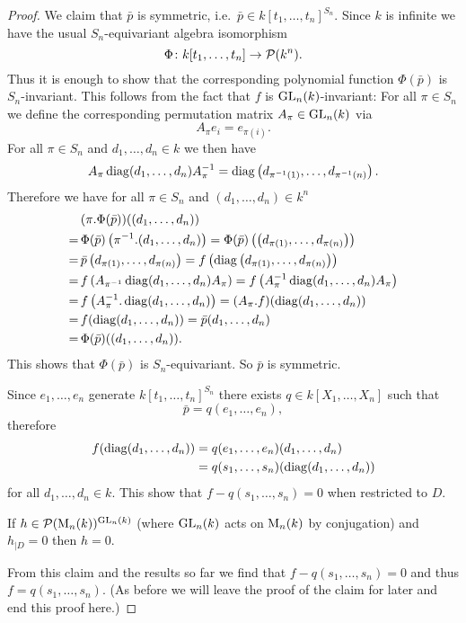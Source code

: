 \begin{proof}
 We claim that $\bar{p}$ is symmetric, i.e.\ $\bar{p} \in k[t_1, \dotsc, t_n]^{S_n}$. Since $k$ is infinite we have the usual $S_n$-equivariant algebra isomorphism
 \[
 \Phi \colon k[t_1, \dotsc, t_n] \to \mathcal{P}(k^n).
 \]
 Thus it is enough to show that the corresponding polynomial function $\Phi(\bar{p})$ is $S_n$-invariant. This follows from the fact that $f$ is $\operatorname{GL}_n(k)$-invariant: For all $\pi \in S_n$ we define the corresponding permutation matrix $A_\pi \in \operatorname{GL}_n(k)$ via
 \[
  A_\pi e_i = e_{\pi(i)}.
 \]
 For all $\pi \in S_n$ and $d_1, \dotsc, d_n \in k$ we then have
 \[
  A_\pi \operatorname{diag}(d_1, \dotsc, d_n) A_\pi^{-1}
  = \operatorname{diag}\left(d_{\pi^{-1}(1)}, \dotsc, d_{\pi^{-1}(n)}\right).
 \]
 Therefore we have for all $\pi \in S_n$ and $(d_1, \dotsc, d_n) \in k^n$
 \begin{align*}
  &\,(\pi.\Phi(\bar{p}))((d_1, \dotsc, d_n)) \\
  =&\, \Phi(\bar{p})\left(\pi^{-1}.(d_1, \dotsc, d_n)\right)
  = \Phi(\bar{p})\left(\left(d_{\pi(1)}, \dotsc, d_{\pi(n)}\right)\right) \\
  =&\, \bar{p}\left(d_{\pi(1)}, \dotsc, d_{\pi(n)}\right)
  = f\left(\operatorname{diag}\left(d_{\pi(1)}, \dotsc, d_{\pi(n)}\right)\right) \\
  =&\, f\left(A_{\pi^{-1}} \operatorname{diag}(d_1, \dotsc, d_n) A_\pi\right)
  = f\left(A_\pi^{-1} \operatorname{diag}(d_1, \dotsc, d_n) A_\pi\right) \\
  =&\, f\left(A_\pi^{-1}.\operatorname{diag}(d_1, \dotsc, d_n)\right)
  = (A_\pi.f)(\operatorname{diag}(d_1, \dotsc, d_n)) \\
  =&\, f(\operatorname{diag}(d_1, \dotsc, d_n))
  = \bar{p}(d_1, \dotsc, d_n) \\
  =&\, \Phi(\bar{p})((d_1, \dotsc, d_n)).
 \end{align*}
 This shows that $\Phi(\bar{p})$ is $S_n$-equivariant. So $\bar{p}$ is symmetric.
 
 Since $e_1, \dotsc, e_n$ generate $k[t_1, \dotsc, t_n]^{S_n}$ there exists $q \in k[X_1, \dotsc, X_n]$ such that
 \[
  \bar{p} = q(e_1, \dotsc, e_n),
 \]
 therefore
 \begin{align*}
  f(\operatorname{diag}(d_1, \dotsc, d_n))
  &= q(e_1, \dotsc, e_n)(d_1, \dotsc, d_n) \\
  &= q(s_1, \dotsc, s_n)(\operatorname{diag}(d_1, \dotsc, d_n))
 \end{align*}
 for all $d_1, \dotsc, d_n \in k$. This show that $f-q(s_1, \dotsc, s_n) = 0$ when restricted to $D$.
 
 \begin{claim}
  If $h \in \mathcal{P}(\operatorname{M}_n(k))^{\operatorname{GL}_n(k)}$ (where $\operatorname{GL}_n(k)$ acts on $\operatorname{M}_n(k)$ by conjugation) and $h_{|D} = 0$ then $h = 0$.
 \end{claim}

 From this claim and the results so far we find that $f - q(s_1, \dotsc, s_n) = 0$ and thus $f = q(s_1, \dotsc, s_n)$. (As before we will leave the proof of the claim for later and end this proof here.)
\end{proof}


